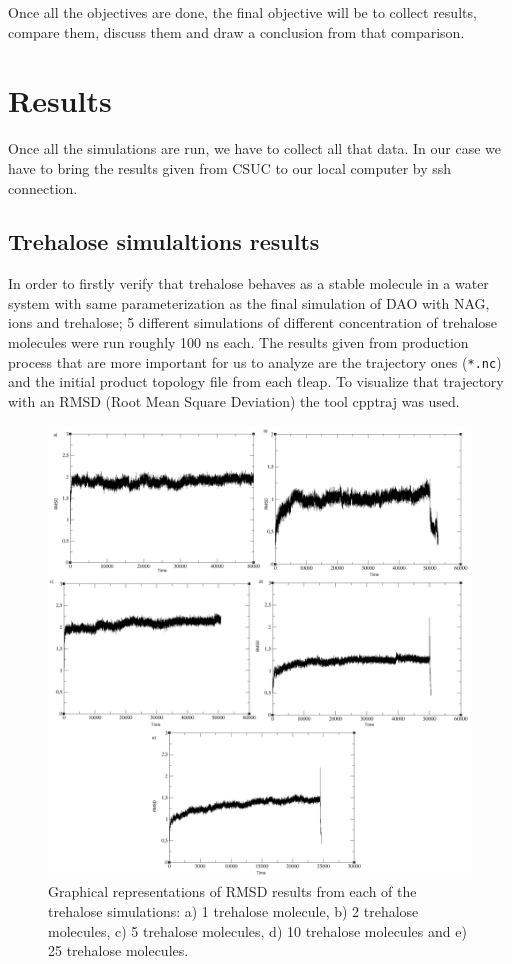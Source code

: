\documentclass[12pt,twoside]{article}
\begin{document}
Once all the objectives are done, the final objective will be to collect results, compare them, discuss them and draw a conclusion from that comparison.

\newpage

\clearpage
\section{Results}

Once all the simulations are run, we have to collect all that data. In our case we have to bring the results given from CSUC to our local computer by ssh connection. 


\subsection{Trehalose simulaltions results}

In order to firstly verify that trehalose behaves as a stable molecule in a water system with same parameterization as the final simulation of DAO with NAG, ions and trehalose; 5 different simulations of different concentration of trehalose molecules were run roughly 100 ns each. The results given from production process that are more important for us to analyze are the trajectory ones (\texttt{*.nc}) and the initial product topology file from each tleap. To visualize that trajectory with an RMSD (Root Mean Square Deviation) the tool cpptraj was used. 

\begin{figure}
    \centering
    \includegraphics[width = 1\hsize]{./figures/rmsdtretot}
    \caption{Graphical representations of RMSD results from each of the trehalose simulations: a) 1 trehalose molecule, b) 2 trehalose molecules, c) 5 trehalose molecules, d) 10 trehalose molecules and e) 25 trehalose molecules.}
\label{fig:rmsdtre}
\end{figure}
\end{document}
